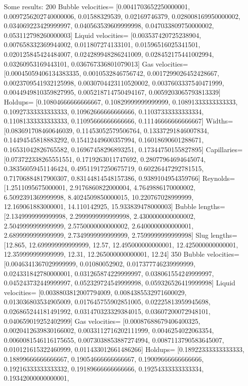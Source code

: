 \documentclass{article}
\begin{document}
Some results:
200
Bubble velocities= [0.0041703652250000001, 0.0097256202740000006, 0.01588329539, 0.02169746379,
0.028008169950000002, 0.034069223429999997, 0.040563539609999998, 0.047033809750000002,
0.053112798260000003]
Liquid velocities= [0.003537420725238904, 0.007658332369944002, 0.011807274133101,
0.01596516025341501, 0.020125845424484007, 0.024289948286241009, 0.028452175441002994,
0.03260953169443101, 0.036767336801079013]
Gas velocities= [0.00045059406134383335, 0.0010532846756742, 0.0017299026452428667,
0.0023709541932125998, 0.0030704423110520002, 0.0037603337540471999, 0.0044949810359827995,
0.005218714750494167, 0.0059203065793813339]
Holdups= [0.10804666666666667, 0.10829999999999999, 0.10891333333333333, 0.10927333333333333,
0.10962666666666666, 0.11037333333333334, 0.11081333333333333, 0.11095666666666666,
0.11146666666666667]
Widths= [0.083691708460646039, 0.11453052579506764, 0.13337291846007834, 0.14494545818883292,
0.15412449600357994, 0.16018690601288671, 0.16531042826765582, 0.16967458296893251,
0.17344750155827895]
Capillaries= [0.073722338265551551, 0.1719263011747692, 0.28077964694645074, 0.38356059451146424,
0.49511917250675719, 0.60226447292781515, 0.71706884817900307, 0.83144814548157386,
0.9389104954359766]
Reynolds= [1.2511095675000001, 2.9176860822000004, 4.7649886170000002, 6.5092391369999998,
8.4024509850000015, 10.220767028999999, 12.169061883000001, 14.110142925, 15.933839478000003]
Bubble lengths= [2.1349999999999998, 2.2999999999999998, 2.4300000000000002, 2.5049999999999999,
2.5750000000000002, 2.6400000000000001, 2.6899999999999999, 2.7349999999999999, 2.7599999999999998]
Slug lengths= [12.865, 12.699999999999999, 12.57, 12.495000000000001, 12.425000000000001,
12.359999999999999, 12.31, 12.265000000000001, 12.24]
350
Bubble velocities= [0.0046341367029999999, 0.01080052902, 0.017377746239999999,
0.024331842780000001, 0.031265874229999997, 0.038061554249999997, 0.045243732449999997,
0.052329724549999998, 0.059326526419999998]
Liquid velocities= [0.0038803812007794009, 0.0084385532971600029, 0.013036803534905009,
0.017645755902851005, 0.02225813959945698, 0.026865244181491992, 0.031470323329384015,
0.03607200072948101, 0.040659019252402999]
Gas velocities= [0.00087688679406400325, 0.0020412639830166002, 0.0033112716202111999,
0.0046254022063354, 0.0060081546116175655, 0.0073038853887274994, 0.0087113790583645007,
0.010121615322460999, 0.011433012661486266]
Holdups= [0.18922333333333333, 0.18899666666666667, 0.19054666666666667, 0.19009666666666666,
0.19216333333333332, 0.19189666666666666, 0.19254333333333334, 0.19342000000000001,
\end{document}
